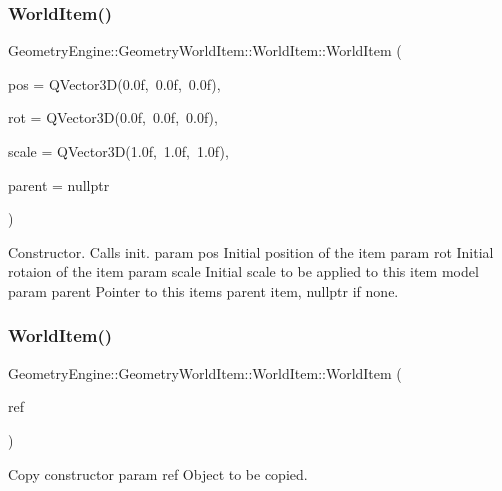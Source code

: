 \subsubsection{\texorpdfstring{WorldItem()}{WorldItem()}\hspace{0.1cm}{\footnotesize\ttfamily [1/2]}}
{\footnotesize\ttfamily Geometry\+Engine\+::\+Geometry\+World\+Item\+::\+World\+Item\+::\+World\+Item (\begin{DoxyParamCaption}\item[{const Q\+Vector3D \&}]{pos = {\ttfamily QVector3D(0.0f,~0.0f,~0.0f)},  }\item[{const Q\+Vector3D \&}]{rot = {\ttfamily QVector3D(0.0f,~0.0f,~0.0f)},  }\item[{const Q\+Vector3D \&}]{scale = {\ttfamily QVector3D(1.0f,~1.0f,~1.0f)},  }\item[{\mbox{\hyperlink{class_geometry_engine_1_1_geometry_world_item_1_1_world_item}{World\+Item}} $\ast$}]{parent = {\ttfamily nullptr} }\end{DoxyParamCaption})}

Constructor. Calls init. param pos Initial position of the item param rot Initial rotaion of the item param scale Initial scale to be applied to this item model param parent Pointer to this items parent item, nullptr if none. \mbox{\label{class_geometry_engine_1_1_geometry_world_item_1_1_world_item_a3d32026ae29b40588fb8497df126ce6d}} 
\subsubsection{\texorpdfstring{WorldItem()}{WorldItem()}\hspace{0.1cm}{\footnotesize\ttfamily [2/2]}}
{\footnotesize\ttfamily Geometry\+Engine\+::\+Geometry\+World\+Item\+::\+World\+Item\+::\+World\+Item (\begin{DoxyParamCaption}\item[{const \mbox{\hyperlink{class_geometry_engine_1_1_geometry_world_item_1_1_world_item}{World\+Item}} \&}]{ref }\end{DoxyParamCaption})}

Copy constructor param ref Object to be copied. 

